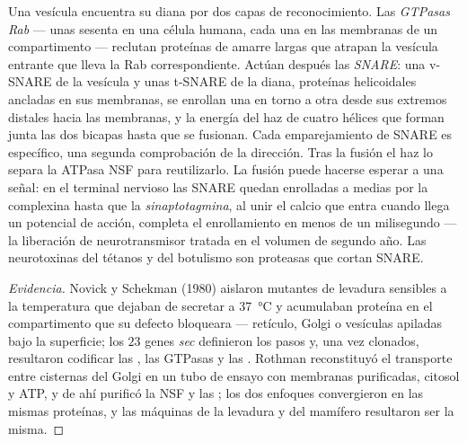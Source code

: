 \begin{definition}\label{def:b3:membrane-traffic:fusion}
Una vesícula encuentra su diana por dos capas de reconocimiento. Las
\emph{GTPasas Rab} --- unas sesenta en una célula humana, cada una en las
membranas de un compartimento --- reclutan proteínas de amarre largas que
atrapan la vesícula entrante que lleva la Rab correspondiente. Actúan
después las \emph{SNARE}: una v-SNARE de la vesícula y unas t-SNARE de la
diana, proteínas helicoidales ancladas en sus membranas, se enrollan una
en torno a otra desde sus extremos distales hacia las membranas, y la
energía del haz de cuatro hélices que forman junta las dos bicapas hasta
que se fusionan. Cada emparejamiento de SNARE es específico, una segunda
comprobación de la dirección. Tras la fusión el haz lo separa la ATPasa
NSF para reutilizarlo. La fusión puede hacerse esperar a una señal: en el
terminal nervioso las SNARE quedan enrolladas a medias por la complexina
hasta que la \emph{sinaptotagmina}, al unir el calcio que entra cuando
llega un potencial de acción, completa el enrollamiento en menos de un
milisegundo --- la liberación de neurotransmisor tratada en el volumen de
segundo año. Las neurotoxinas del tétanos y del botulismo son proteasas
que cortan SNARE.
\end{definition}

\begin{proof}[Evidencia]
Novick y Schekman (1980) aislaron mutantes de levadura sensibles a la
temperatura que dejaban de secretar a \qty{37}{\celsius} y acumulaban
proteína en el compartimento que su defecto bloqueara --- retículo, Golgi
o vesículas apiladas bajo la superficie; los $23$ genes \emph{sec}
definieron los pasos y, una vez clonados, resultaron codificar las
, las GTPasas y las . Rothman reconstituyó el transporte
entre cisternas del Golgi en un tubo de ensayo con membranas purificadas,
citosol y ATP, y de ahí purificó la NSF y las ; los dos enfoques
convergieron en las mismas proteínas, y las máquinas de la levadura y del
mamífero resultaron ser la misma.
\end{proof}

